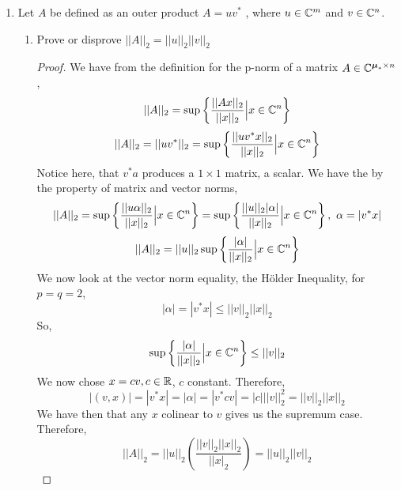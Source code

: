 \documentclass{article}
\begin{document}
\begin{enumerate}
    \begin{proof}
    
    Since we have that $A$ is a real, symmetric matrix, it is true that its eigenvectors form an orthogonal basis which spans $\R^m$. Then we could write $b$ as a linear combination of the eigenvalues of $A$., 
    \[
        b = c_1v_1 + \cdots + c_mv_m = A(d_1v_1 + \cdots + d_mv_m), c_i = \alpha_i d_i
    \]  
    We now need to find the scalar coefficients $d_i$ to obtain the correct linear combination. We next look at the inner products $(v_i, b), (v_i, Av_i)$. We have, 
    \[
        (v_i, b) = v_i^T(\alpha_1d_1v_1 + \cdots + \alpha_md_mv_m) = \alpha_id_iv_i^Tv_i
    \]
    The inner product of $v_i$ with any $v_j, i\neq j$ is zero by orthogonality, so only the $v_i^Tv_i$ term remains. 
    \[
        (v_i, Av_i) = v_i^T(Av_i) = v_i^T(\alpha_iv_i) = \alpha_i v_i^Tv_i
    \]
    We have then that, $\frac{(v_i, b)}{(v_i, Av_i)} = d_i$. Therefore we can now write, 
    \[
        x = \sum_{i=1}^m \frac{(v_i, b)}{(v_i, Av_i)}v_i = \sum_{i=1}^m \frac{v_i^T b}{v_i^TAv_i}v_i
    \]
    \end{proof} 

    \item %
    Let $A$ be defined as an outer product $A = uv^*$ , where $u \in \mathbb{C}^m$ and $v \in \mathbb{C}^n$.
    \begin{enumerate}
        \item
        Prove or disprove $||A||_2 = ||u||_2||v||_2$
        \begin{proof}
            We have from the definition for the p-norm of a matrix $A \in \mathbb{C}^{\boldsymbol{\mu}_* \times n}$, 
            \[
                ||A||_2 = \sup\left\{\frac{||Ax||_2}{||x||_2} \Big| x \in \mathbb{C}^n\right\}
            \]   
            \[
                ||A||_2 = ||u v^*||_2 = \sup\left\{\frac{||uv^*x||_2}{||x||_2} \Big| x\in \mathbb{C}^n\right\}
            \]
            Notice here, that $v^*a$ produces a $1\times 1$ matrix, a scalar. We have the by the property of matrix and vector norms, 
            \[
                ||A||_2 = \sup\left\{\frac{||u\alpha||_2}{||x||_2} \Big| x\in \mathbb{C}^n\right\} = \sup\left\{\frac{||u||_2|\alpha|}{||x||_2} \Big| x\in \mathbb{C}^n\right\}, \text{ } \alpha = |v^*x|
            \]
            \[
                ||A||_2 = ||u||_2\sup\left\{\frac{|\alpha|}{||x||_2} \Big| x\in \mathbb{C}^n\right\}
            \]
            We now look at the vector norm equality, the H\"{o}lder Inequality, for $p = q = 2$,
            \[
                |\alpha| = |v^*x| \le ||v||_2||x||_2
            \]
            So, 
            \[
                \sup\left\{\frac{|\alpha|}{||x||_2} \Big| x\in \mathbb{C}^n\right\} \le ||v||_2
            \]
            We now chose $x = cv, c \in \mathbb{R}$, $c$ constant. Therefore, 
            \[
                |(v, x)| = |v^*x| =|\alpha|= |v^*cv| = |c|||v||_2^2 = ||v||_2||x||_2
            \]
            We have then that any $x$ colinear to $v$ gives us the supremum case. Therefore, 
            \[
                ||A||_2 = ||u||_2\left(\frac{||v||_2||x||_2}{||x|_2}\right) = ||u||_2||v||_2
            \]
        \end{proof}


\end{enumerate}
\end{enumerate}
\end{document}
